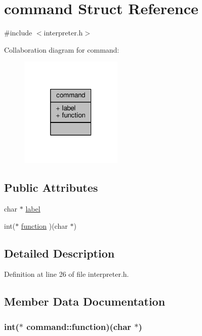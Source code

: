 \hypertarget{structcommand}{\section{command Struct Reference}
\label{structcommand}
}


{\ttfamily \#include $<$interpreter.\-h$>$}



Collaboration diagram for command\-:
\nopagebreak
\begin{figure}[H]
\begin{center}
\leavevmode
\includegraphics[width=138pt]{structcommand__coll__graph}
\end{center}
\end{figure}
\subsection*{Public Attributes}
\begin{DoxyCompactItemize}
\item 
char $\ast$ \hyperlink{structcommand_a556cd9d8b435c0017704254f3d9a3e57}{label}
\item 
int($\ast$ \hyperlink{structcommand_a217dfc1d06446ee6606a9a007fa6a7b6}{function} )(char $\ast$)
\end{DoxyCompactItemize}


\subsection{Detailed Description}


Definition at line 26 of file interpreter.\-h.



\subsection{Member Data Documentation}
\hypertarget{structcommand_a217dfc1d06446ee6606a9a007fa6a7b6}{
\subsubsection[{function}]{\setlength{\rightskip}{0pt plus 5cm}int($\ast$ command\-::function)(char $\ast$)}}\label{structcommand_a217dfc1d06446ee6606a9a007fa6a7b6}


